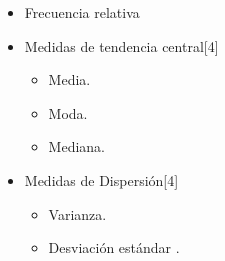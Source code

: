   \begin{itemize}
  
   \item Frecuencia relativa    
   \item Medidas de tendencia central[4] 
	   \begin{itemize}
		 	\item Media. 
		 	\item Moda. 
		 	\item Mediana.
		 \end{itemize}
 
  \item Medidas de Dispersión[4] 
  \begin{itemize}
 
  \item Varianza.  
 
 
     \item Desviaci\'on est\'andar .
\end{itemize} 

\end{itemize}  



